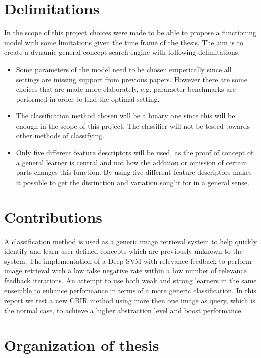 \section{Delimitations}
\label{sec:intro:delimitations}
In the scope of this project choices were made to be able to propose a functioning model with some limitations given the time frame of the thesis. The aim is to create a dynamic general concept search engine with following delimitations.
\begin{itemize}
	\item Some parameters of the model need to be chosen emperically since all settings are missing support from previous papers. However there are some choices that are made more elaborately, e.g. parameter benchmarks are performed in order to find the optimal setting. 
	\item The classification method chosen will be a binary one since this will be enough in the scope of this project. The classifier will not be tested towards other methods of classifying.
	\item Only five different feature descriptors will be used, as the proof of concept of a general learner is central and not how the addition or omission of certain parts changes this function. By using five different feature descriptors makes it possible to get the distinction and variation sought for in a general sense.
\end{itemize}

\section{Contributions}

A classification method is used as a generic image retrieval system to help quickly identify and learn user defined concepts which are previously unknown to the system. 
The implementation of a Deep SVM with relevance feedback to perform image retrieval with a low false negative rate within a low number of relevance feedback iterations. 
An attempt to use both weak and strong learners in the same ensemble to enhance performance in terms of a more generic classification. In this report we test a new CBIR method using more then one image as query, which is the normal case, to achieve a higher abstraction level and boost performance. 

\section{Organization of thesis}

